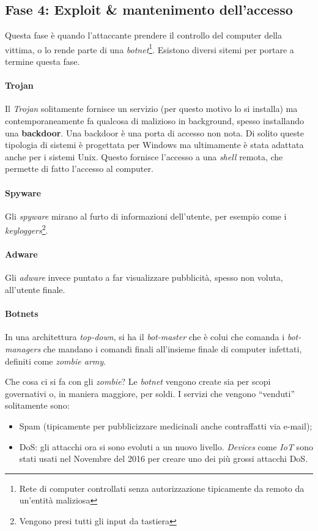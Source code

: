 \subsection{Fase 4: Exploit \& mantenimento dell'accesso}

Questa fase è quando l'attaccante prendere il controllo del computer della 
vittima, o lo rende parte di una \textit{botnet}\footnote{Rete di computer 
controllati senza autorizzazione tipicamente da remoto da un'entità maliziosa}. 
Esistono diversi sitemi per portare a termine questa fase.

\paragraph*{Trojan} Il \textit{Trojan} solitamente fornisce un servizio (per 
questo motivo lo si installa) ma contemporaneamente fa qualcosa di malizioso in 
background, spesso installando una \textbf{backdoor}.
Una backdoor è una porta di accesso non nota. Di solito queste tipologia di 
sistemi è progettata per Windows ma ultimamente è stata adattata anche per i 
sistemi Unix. Questo fornisce l'accesso a una \textit{shell} remota, che 
permette di fatto l'accesso al computer.

\paragraph*{Spyware} Gli \textit{spyware} mirano al furto di informazioni 
dell'utente, per esempio come i \textit{keyloggers}\footnote{Vengono presi tutti 
gli input da tastiera}. 

\paragraph*{Adware} Gli \textit{adware} invece puntato a far visualizzare 
pubblicità, spesso non voluta, all'utente finale.

\paragraph*{Botnets}

In una architettura \textit{top-down}, si ha il \textit{bot-master} che è colui 
che comanda i \textit{bot-managers} che mandano i comandi finali all'insieme 
finale di computer infettati, definiti come \textit{zombie army}.

Che cosa ci si fa con gli \textit{zombie}? Le \textit{botnet} vengono create 
sia per scopi governativi o, in maniera maggiore, per soldi. I servizi che 
vengono ``venduti'' solitamente sono:
\begin{itemize}
\item Spam (tipicamente per pubblicizzare medicinali anche contraffatti via 
e-mail);
\item DoS: gli attacchi ora si sono evoluti a un nuovo livello. \textit{Devices} 
come \textit{IoT} sono stati usati nel Novembre del 2016 per creare uno dei più 
grossi attacchi DoS.
\end{itemize}

